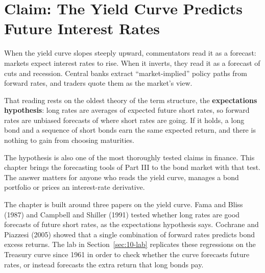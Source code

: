 \makeatletter
{}
\makeatother

\chapter{Claim: The Yield Curve Predicts Future Interest Rates}
\label{ch:10}

When the yield curve slopes steeply upward, commentators read it as a forecast: markets expect interest rates to rise. When it inverts, they read it as a forecast of cuts and recession. Central banks extract ``market-implied'' policy paths from forward rates, and traders quote them as the market's view.

That reading rests on the oldest theory of the term structure, the \textbf{expectations hypothesis}: long rates are averages of expected future short rates, so forward rates are unbiased forecasts of where short rates are going. If it holds, a long bond and a sequence of short bonds earn the same expected return, and there is nothing to gain from choosing maturities.

The hypothesis is also one of the most thoroughly tested claims in finance. This chapter brings the forecasting tools of Part III to the bond market with that test. The answer matters for anyone who reads the yield curve, manages a bond portfolio or prices an interest-rate derivative.

The chapter is built around three papers on the yield curve. Fama and Bliss (1987) and Campbell and Shiller (1991) tested whether long rates are good forecasts of future short rates, as the expectations hypothesis says. Cochrane and Piazzesi (2005) showed that a single combination of forward rates predicts bond excess returns. The lab in Section~\ref{sec:10-lab} replicates these regressions on the Treasury curve since 1961 in order to check whether the curve forecasts future rates, or instead forecasts the extra return that long bonds pay.

